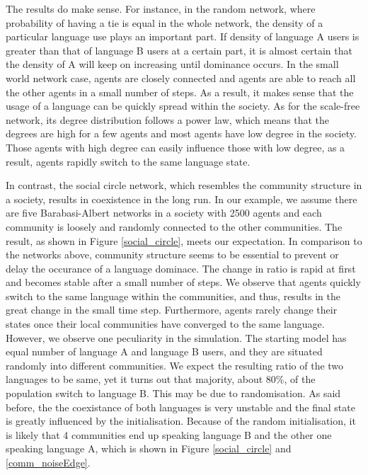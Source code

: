 \documentclass[a4paper, 11pt]{article}
\begin{document}
The results do make sense. For instance, in the random network, where probability of having a tie is equal in the whole network, the density of a particular language use plays an important part. If density of language A users is greater than that of language B users at a certain part, it is almost certain that the density of A will keep on increasing until dominance occurs. In the small world network case, agents are closely connected and agents are able to reach all the other agents in a small number of steps. As a result, it makes sense that the usage of a language can be quickly spread within the society. As for the scale-free network, its degree distribution follows a power law, which means that the degrees are high for a few agents and most agents have low degree in the society. Those agents with high degree can easily influence those with low degree, as a result, agents rapidly switch to the same language state. 

In contrast, the social circle network, which resembles the community structure in a society, results in coexistence in the long run. In our example, we assume there are five Barabasi-Albert networks in a society with 2500 agents and each community is loosely and randomly connected to the other communities. The result, as shown in Figure \ref{social_circle}, meets our expectation. In comparison to the networks above, community structure seems to be essential to prevent or delay the occurance of a language dominace. The change in ratio is rapid at first and becomes stable after a small number of steps. We observe that agents quickly switch to the same language within the communities, and thus, results in the great change in the small time step. Furthermore, agents rarely change their states once their local communities have converged to the same language. However, we observe one peculiarity in the simulation. The starting model has equal number of language A and language B users, and they are situated randomly into different communities. We expect the resulting ratio of the two languages to be same, yet it turns out that majority, about 80\%, of the population switch to language B. This may be due to randomisation. As said before, the the coexistance of both languages is very unstable and the final state is greatly influenced by the initialisation. Because of the random initialisation, it is likely that 4 communities end up speaking language B and the other one speaking language A, which is shown in Figure \ref{social_circle} and \ref{comm_noiseEdge}.%
\end{document}
